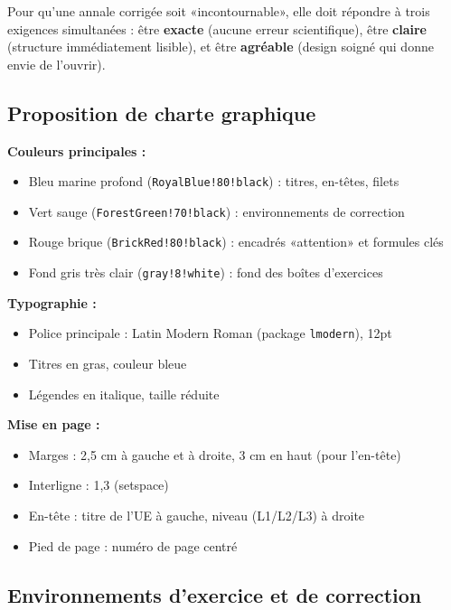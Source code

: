 \documentclass[12pt,a4paper]{article}
\begin{document}
Pour qu'une annale corrigée soit «incontournable», elle doit répondre à trois exigences simultanées : être \textbf{exacte} (aucune erreur scientifique), être \textbf{claire} (structure immédiatement lisible), et être \textbf{agréable} (design soigné qui donne envie de l'ouvrir).

\subsection{Proposition de charte graphique}

\begin{recommandation}[title=Charte graphique recommandée]
\textbf{Couleurs principales :}
\begin{itemize}
  \item Bleu marine profond (\verb|RoyalBlue!80!black|) : titres, en-têtes, filets
  \item Vert sauge (\verb|ForestGreen!70!black|) : environnements de correction
  \item Rouge brique (\verb|BrickRed!80!black|) : encadrés «attention» et formules clés
  \item Fond gris très clair (\verb|gray!8!white|) : fond des boîtes d'exercices
\end{itemize}

\textbf{Typographie :}
\begin{itemize}
  \item Police principale : Latin Modern Roman (package \verb|lmodern|), 12pt
  \item Titres en gras, couleur bleue
  \item Légendes en italique, taille réduite
\end{itemize}

\textbf{Mise en page :}
\begin{itemize}
  \item Marges : 2{,}5 cm à gauche et à droite, 3 cm en haut (pour l'en-tête)
  \item Interligne : 1{,}3 (setspace)
  \item En-tête : titre de l'UE à gauche, niveau (L1/L2/L3) à droite
  \item Pied de page : numéro de page centré
\end{itemize}
\end{recommandation}

\subsection{Environnements d'exercice et de correction}
\end{document}
